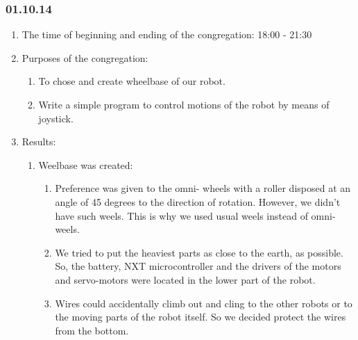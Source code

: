 
\subsubsection{01.10.14}

\begin{enumerate}
	\item The time of beginning and ending of the congregation:
	18:00 - 21:30
	\item Purposes of the congregation:
	\begin{enumerate}
		\item To chose and create wheelbase of our robot.
		
		\item Write a simple program to control motions of the robot by means of joystick.
		
	\end{enumerate}
	
	\item Results:
	\begin{enumerate}
		\item Weelbase was created:
		\begin{enumerate}
			\item Preference was given to the omni- wheels with a roller disposed at an angle of 45 degrees to the direction of rotation. However, we didn't have such weels. This is why we used usual weels instead of omni-weels.
			
			\item We tried to put the heaviest parts as close to the earth, as possible. So, the battery, NXT microcontroller and the drivers of the motors and servo-motors were located in the lower part of the robot. 
			
			\item Wires could accidentally climb out and cling to the other robots or to the moving parts of the robot itself. So we decided protect the wires from the bottom.
			

\end{enumerate}
\end{enumerate}
\end{enumerate}
